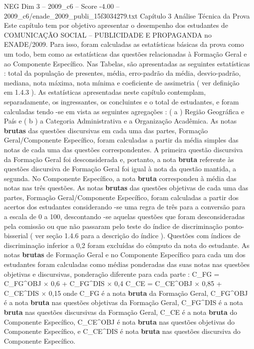 \begin{textsample}{NEG Dim 3 – 2009\_c6 – Score -4.00 – 2009\_c6/enade\_2009\_publi\_15f3034279.txt}  \label{ex:f3_neg_041}
Capítulo 3 Análise Técnica da Prova Este capítulo tem por objetivo apresentar o desempenho dos estudantes de COMUNICAÇÃO SOCIAL – PUBLICIDADE E PROPAGANDA no ENADE/2009.
Para isso, foram calculadas as estatísticas básicas da prova como um todo, bem como as estatísticas das questões relacionadas à Formação Geral e ao Componente Específico.
Nas Tabelas, são apresentadas as seguintes estatísticas : total da população de presentes, média, erro-padrão da média, desvio-padrão, mediana, nota máxima, nota mínima e coeficiente de assimetria ( ver definição em 1.4.3 ).
As estatísticas apresentadas neste capítulo contemplam, separadamente, os ingressantes, os concluintes e o total de estudantes, e foram calculadas tendo -se em vista as seguintes agregações : ( a ) Região Geográfica e País e ( b ) a Categoria Administrativa e a Organização Acadêmica.
As notas \textbf{brutas} das questões discursivas em cada uma das partes, Formação Geral/Componente Específico, foram calculadas a partir da média simples das notas de cada uma das questões correspondentes.
A primeira questão discursiva da Formação Geral foi desconsiderada e, portanto, a nota \textbf{bruta} referente às questões discursiva de Formação Geral foi igual à nota da questão mantida, a segunda.
No Componente Específico, a nota \textbf{bruta} correspondeu à média das notas nas três questões.
As notas \textbf{brutas} das questões objetivas de cada uma das partes, Formação Geral/Componente Específico, foram calculadas a partir dos acertos dos estudantes considerando -se uma regra de três para a conversão para a escala de 0 a 100, descontando -se aquelas questões que foram desconsideradas pela comissão ou que não passaram pelo teste do índice de discriminação ponto-bisserial ( ver seção 1.4.6 para a descrição do índice ).
Questões com índices de discriminação inferior a 0,2 foram excluídas do cômputo da nota do estudante.
As notas \textbf{brutas} de Formação Geral e no Componente Específico para cada um dos estudantes foram calculadas como médias ponderadas das suas notas nas questões objetivas e discursivas, ponderação diferente para cada parte : C\_FG = C\_FG\textasciicircum{}OBJ × 0,6 + C\_FG\textasciicircum{}DIS × 0,4 C\_CE = C\_CE\textasciicircum{}OBJ × 0,85 + C\_CE\textasciicircum{}DIS × 0,15 onde C\_FG é a nota \textbf{bruta} da Formação Geral, C\_FG\textasciicircum{}OBJ é a nota \textbf{bruta} nas questões objetivas da Formação Geral, C\_FG\textasciicircum{}DIS é a nota \textbf{bruta} nas questões discursivas da Formação Geral, C\_CE é a nota \textbf{bruta} do Componente Específico, C\_CE\textasciicircum{}OBJ é nota \textbf{bruta} nas questões objetivas do Componente Específico, e C\_CE\textasciicircum{}DIS é nota \textbf{bruta} nas questões discursiva do Componente Específico.

\end{textsample}
